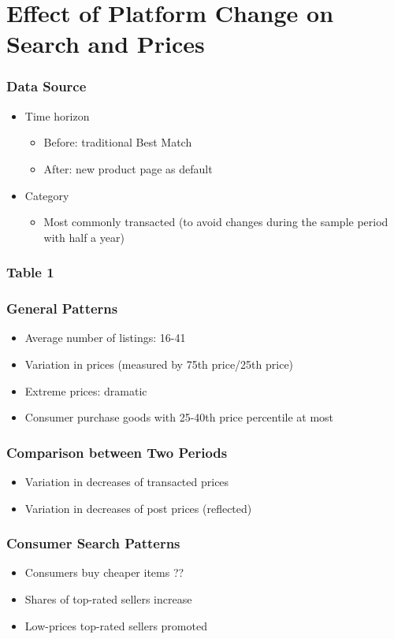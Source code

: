 \documentclass{beamer}
\begin{document}
\section{Effect of Platform Change on Search and Prices}
\begin{frame}
\frametitle{Data Source}
\begin{itemize}
\item Time horizon 
\begin{itemize}
\item Before: traditional Best Match
\item After: new product page as default
\end{itemize}
\item Category
\begin{itemize}
\item Most commonly transacted (to avoid changes during the sample period with half a year)
\end{itemize}
\end{itemize}
\end{frame}

\begin{frame}
\frametitle{Table 1}
\end{frame}

\begin{frame}
\frametitle{General Patterns}
\begin{itemize}
\item Average number of listings: 16-41
\item Variation in prices (measured by 75th price/25th price)
\item Extreme prices: dramatic
\item Consumer purchase goods with 25-40th price percentile at most
\end{itemize}
\end{frame}

\begin{frame}
\frametitle{Comparison between Two Periods}
\begin{itemize}
\item Variation in decreases of transacted prices 
\item Variation in decreases of post prices (reflected) 
\end{itemize}
\end{frame}

\begin{frame}
\frametitle{Consumer Search Patterns}
\begin{itemize}
\item Consumers buy cheaper items ??
\item Shares of top-rated sellers increase
\item Low-prices top-rated sellers promoted
\end{itemize}
\end{frame}
\end{document}
